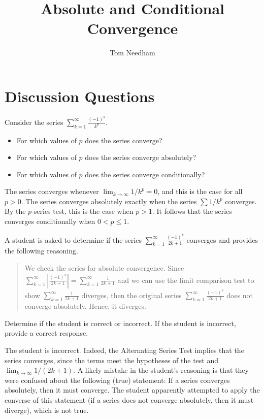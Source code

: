 \documentclass[]{ximera}
\author{Tom Needham}
\title[Collaborate:]{Absolute and Conditional Convergence}
\begin{document}
\begin{abstract}
\end{abstract}
\maketitle

\section{Discussion Questions}

\begin{problem}
Consider the series $\sum_{k=1}^{\infty} \frac{(-1)^k}{k^p}$. 

\begin{itemize}
\item For which values of $p$ does the series converge? 
\item For which values of $p$ does the series converge absolutely? 
\item For which values of $p$ does the series converge conditionally? 
\end{itemize}

\begin{solution}
The series converges whenever $\lim_{k \rightarrow \infty} 1/k^p = 0$, and this is the case for all $p > 0$. The series converges absolutely exactly when the series  $\sum 1/k^p$ converges. By the $p$-series test, this is the case when $p > 1$. It follows that the series converges conditionally when $0 < p \leq 1$. 
\end{solution}
\end{problem}

\begin{problem}
A student is asked to determine if the series $\sum_{k=1}^{\infty} \frac{(-1)^k}{2k+1}$ converges and provides the following reasoning. 

\begin{quote}
We check the series for absolute convergence.   Since $\sum_{k=1}^{\infty} \left| \frac{(-1)^k}{2k+1} \right| = \sum_{k=1}^{\infty} \frac{1}{2k+1}$ and we can use the limit comparison test to show $\sum_{k=1}^{\infty} \frac{1}{2k+1}$ diverges, then the original series $\sum_{k=1}^{\infty} \frac{(-1)^k}{2k+1}$ does not converge absolutely.  Hence, it diverges.
\end{quote}
Determine if the student is correct or incorrect.  If the student is incorrect, provide a correct response.
\begin{solution}
The student is incorrect. Indeed, the Alternating Series Test implies that the series converges, since the terms meet the hypotheses of the test and $\lim_{k \rightarrow \infty} 1/(2k+1)$. A likely mistake in the student's reasoning is that they were confused about the following (true) statement: If a series converges absolutely, then it must converge. The student apparently attempted to apply the converse of this statement (if a series does not converge absolutely, then it must diverge), which is not true.
\end{solution}
\end{problem}
\end{document}
